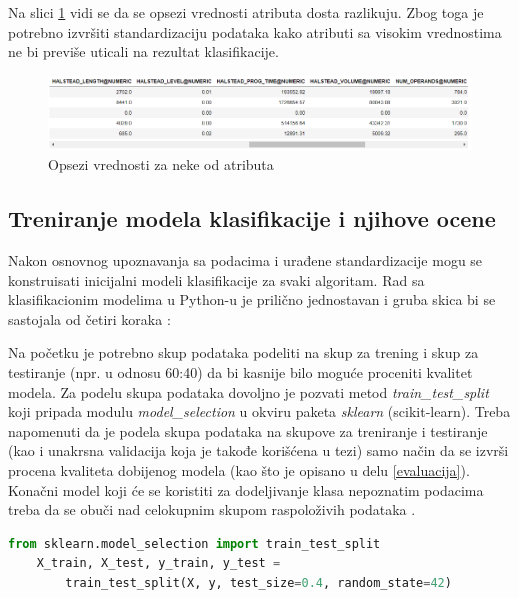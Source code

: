 \documentclass[12pt,oneside]{memoir}
\begin{document}
Na slici \ref{fig:atr_opsezi} vidi se da se opsezi vrednosti atributa dosta razlikuju. Zbog toga je potrebno izvršiti standardizaciju podataka kako atributi sa visokim vrednostima ne bi previše uticali na rezultat klasifikacije. 

\begin{figure}[!ht]
  \centering
  \includegraphics[width=1\textwidth]{atr_opsezi.png}
  \caption{Opsezi vrednosti za neke od atributa}
  \label{fig:atr_opsezi}
\end{figure}

\subsection{Treniranje modela klasifikacije i njihove ocene}

Nakon osnovnog upoznavanja sa podacima i urađene standardizacije mogu se konstruisati inicijalni modeli klasifikacije za svaki algoritam. Rad sa klasifikacionim modelima u Python-u je prilično jednostavan i gruba skica bi se sastojala od četiri koraka \cite{scikit-learn}:

Na početku je potrebno skup podataka podeliti na skup za trening i skup za testiranje (npr. u odnosu 60:40) da bi kasnije bilo moguće proceniti kvalitet modela. Za podelu skupa podataka dovoljno je pozvati metod \textit{train\_test\_split} koji pripada modulu \textit{model\_selection} u okviru paketa \textit{sklearn} (scikit-learn). Treba napomenuti da je podela skupa podataka na skupove za treniranje i testiranje (kao i unakrsna validacija koja je takođe korišćena u tezi) samo način da se izvrši procena kvaliteta dobijenog modela (kao što je opisano u delu \ref{evaluacija}). Konačni model koji će se koristiti za dodeljivanje klasa nepoznatim podacima treba da se obuči nad celokupnim skupom raspoloživih podataka \cite{mladen}.

\begin{lstlisting}[language=Python, basicstyle=\tiny]
	from sklearn.model_selection import train_test_split
	X_train, X_test, y_train, y_test = 
		train_test_split(X, y, test_size=0.4, random_state=42)
\end{lstlisting}
\end{document}
